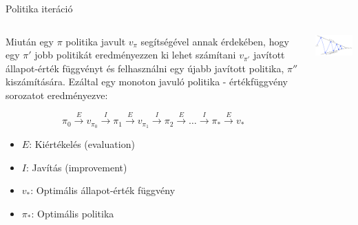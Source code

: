\documentclass[english, aspectratio=169]{beamer}
\begin{document}
\begin{frame}{Politika iteráció}
\begin{columns}
\begin{column}{.6\textwidth}
Miután egy $\pi$ politika javult $v_\pi$ segítségével annak érdekében, hogy egy $\pi'$ jobb politikát eredményezzen ki lehet számítani $v_{\pi'}$ javított állapot-érték függvényt és felhasználni egy újabb javított politika, $\pi''$ kiszámítására. Ezáltal egy monoton javuló politika - értékfüggvény sorozatot eredményezve:
\begin{small}
\[
\pi_{0}\stackrel{E}{\longrightarrow}v_{\pi_{0}}\stackrel{I}{\longrightarrow}\pi_{1}\stackrel{E}{\longrightarrow}v_{\pi_{1}}\stackrel{I}{\longrightarrow}\pi_{2}\stackrel{E}{\longrightarrow}\hdots\stackrel{I}{\longrightarrow}\pi_{*}\stackrel{E}{\longrightarrow}v_{*}
\]
\begin{itemize}
	\item $E$: Kiértékelés (evaluation)\\
	\item $I$: Javítás (improvement)
	\item $v_{*}$: Optimális állapot-érték függvény
	\item $\pi_{*}$: Optimális politika
\end{itemize}
\end{small}
\end{column}
\begin{column}{.4\textwidth}
\begin{center}
\includegraphics[width=6cm, keepaspectratio]{images/solving_11.png}
\end{center}
\end{column}
\end{columns}
\end{frame}
\end{document}
